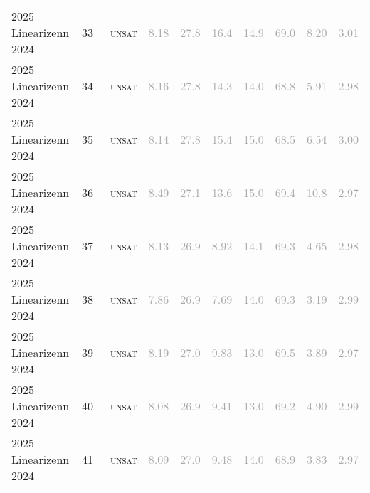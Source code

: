 \begin{center}
{\begin{longtable}{@{}llllllllll@{}}
2025 Linearizenn 2024 & 33 & ~\textsc{unsat} & \textcolor{darkgray}{8.18} & \textcolor{darkgray}{27.8} & \textcolor{darkgray}{16.4} & \textcolor{darkgray}{14.9} & \textcolor{darkgray}{69.0} & \textcolor{darkgray}{8.20} & \textcolor{darkgray}{3.01} \\
2025 Linearizenn 2024 & 34 & ~\textsc{unsat} & \textcolor{darkgray}{8.16} & \textcolor{darkgray}{27.8} & \textcolor{darkgray}{14.3} & \textcolor{darkgray}{14.0} & \textcolor{darkgray}{68.8} & \textcolor{darkgray}{5.91} & \textcolor{darkgray}{2.98} \\
2025 Linearizenn 2024 & 35 & ~\textsc{unsat} & \textcolor{darkgray}{8.14} & \textcolor{darkgray}{27.8} & \textcolor{darkgray}{15.4} & \textcolor{darkgray}{15.0} & \textcolor{darkgray}{68.5} & \textcolor{darkgray}{6.54} & \textcolor{darkgray}{3.00} \\
2025 Linearizenn 2024 & 36 & ~\textsc{unsat} & \textcolor{darkgray}{8.49} & \textcolor{darkgray}{27.1} & \textcolor{darkgray}{13.6} & \textcolor{darkgray}{15.0} & \textcolor{darkgray}{69.4} & \textcolor{darkgray}{10.8} & \textcolor{darkgray}{2.97} \\
2025 Linearizenn 2024 & 37 & ~\textsc{unsat} & \textcolor{darkgray}{8.13} & \textcolor{darkgray}{26.9} & \textcolor{darkgray}{8.92} & \textcolor{darkgray}{14.1} & \textcolor{darkgray}{69.3} & \textcolor{darkgray}{4.65} & \textcolor{darkgray}{2.98} \\
2025 Linearizenn 2024 & 38 & ~\textsc{unsat} & \textcolor{darkgray}{7.86} & \textcolor{darkgray}{26.9} & \textcolor{darkgray}{7.69} & \textcolor{darkgray}{14.0} & \textcolor{darkgray}{69.3} & \textcolor{darkgray}{3.19} & \textcolor{darkgray}{2.99} \\
2025 Linearizenn 2024 & 39 & ~\textsc{unsat} & \textcolor{darkgray}{8.19} & \textcolor{darkgray}{27.0} & \textcolor{darkgray}{9.83} & \textcolor{darkgray}{13.0} & \textcolor{darkgray}{69.5} & \textcolor{darkgray}{3.89} & \textcolor{darkgray}{2.97} \\
2025 Linearizenn 2024 & 40 & ~\textsc{unsat} & \textcolor{darkgray}{8.08} & \textcolor{darkgray}{26.9} & \textcolor{darkgray}{9.41} & \textcolor{darkgray}{13.0} & \textcolor{darkgray}{69.2} & \textcolor{darkgray}{4.90} & \textcolor{darkgray}{2.99} \\
2025 Linearizenn 2024 & 41 & ~\textsc{unsat} & \textcolor{darkgray}{8.09} & \textcolor{darkgray}{27.0} & \textcolor{darkgray}{9.48} & \textcolor{darkgray}{14.0} & \textcolor{darkgray}{68.9} & \textcolor{darkgray}{3.83} & \textcolor{darkgray}{2.97} \\

\end{longtable}}
\end{center}
